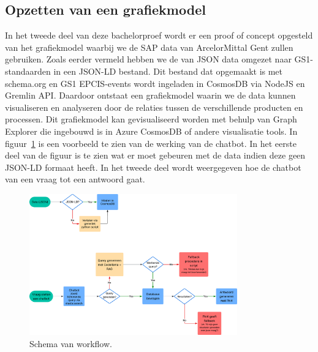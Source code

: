 \subsection{Opzetten van een grafiekmodel}
In het tweede deel van deze bachelorproef wordt er een proof of concept opgesteld van het grafiekmodel waarbij we de SAP data van ArcelorMittal Gent zullen gebruiken.
Zoals eerder vermeld hebben we de van JSON data omgezet naar GS1-standaarden in een JSON-LD bestand. Dit bestand dat opgemaakt is met schema.org en GS1 EPCIS-events wordt ingeladen in CosmosDB via NodeJS en Gremlin API.\@
Daardoor ontstaat een grafiekmodel waarin we de data kunnen visualiseren en analyseren door de relaties tussen de verschillende producten en processen.
Dit grafiekmodel kan gevisualiseerd worden met behulp van Graph Explorer die ingebouwd is in Azure CosmosDB of andere visualisatie tools. 
In figuur~\ref{fig:workflow} is een voorbeeld te zien van de werking van de chatbot.
In het eerste deel van de figuur is te zien wat er moet gebeuren met de data indien deze geen JSON-LD formaat heeft.
In het tweede deel wordt weergegeven hoe de chatbot van een vraag tot een antwoord gaat.

\begin{figure}[H]
    \centering
    \includegraphics[width=0.8\textwidth]{./img/WorkflowThesis.png}
    \caption[Schema workflow]{\label{fig:workflow}Schema van workflow.}
\end{figure}

